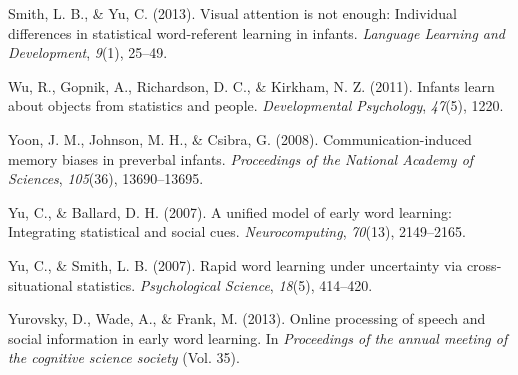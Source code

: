 \documentclass[10pt, letterpaper]{article}
\begin{document}
\leavevmode\hypertarget{ref-smith2013visual}{}%
Smith, L. B., \& Yu, C. (2013). Visual attention is not enough:
Individual differences in statistical word-referent learning in infants.
\emph{Language Learning and Development}, \emph{9}(1), 25--49.

\leavevmode\hypertarget{ref-wu2011infants}{}%
Wu, R., Gopnik, A., Richardson, D. C., \& Kirkham, N. Z. (2011). Infants
learn about objects from statistics and people. \emph{Developmental
Psychology}, \emph{47}(5), 1220.

\leavevmode\hypertarget{ref-yoon2008communication}{}%
Yoon, J. M., Johnson, M. H., \& Csibra, G. (2008). Communication-induced
memory biases in preverbal infants. \emph{Proceedings of the National
Academy of Sciences}, \emph{105}(36), 13690--13695.

\leavevmode\hypertarget{ref-yu2007unified}{}%
Yu, C., \& Ballard, D. H. (2007). A unified model of early word
learning: Integrating statistical and social cues.
\emph{Neurocomputing}, \emph{70}(13), 2149--2165.

\leavevmode\hypertarget{ref-yu2007rapid}{}%
Yu, C., \& Smith, L. B. (2007). Rapid word learning under uncertainty
via cross-situational statistics. \emph{Psychological Science},
\emph{18}(5), 414--420.

\leavevmode\hypertarget{ref-yurovsky2013online}{}%
Yurovsky, D., Wade, A., \& Frank, M. (2013). Online processing of speech
and social information in early word learning. In \emph{Proceedings of
the annual meeting of the cognitive science society} (Vol. 35).


\end{document}
